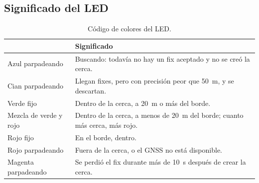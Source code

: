 \subsection{Significado del LED}

\begin{table}[H]
\centering
\small
\begin{tabularx}{\textwidth}{|l X|}
\hline
\tablehead{\textbf{LED} & \textbf{Significado}} \\ \hline
Azul parpadeando & Buscando: todavía no hay un fix aceptado y no se creó la cerca. \\ \hline
Cian parpadeando & Llegan fixes, pero con precisión peor que 50~m, y se descartan. \\ \hline
Verde fijo & Dentro de la cerca, a 20~m o más del borde. \\ \hline
Mezcla de verde y rojo & Dentro de la cerca, a menos de 20~m del borde; cuanto más cerca, más rojo. \\ \hline
Rojo fijo & En el borde, dentro. \\ \hline
Rojo parpadeando & Fuera de la cerca, o el GNSS no está disponible. \\ \hline
Magenta parpadeando & Se perdió el fix durante más de 10~s después de crear la cerca. \\ \hline
\end{tabularx}
\caption{Código de colores del LED.}
\end{table}
